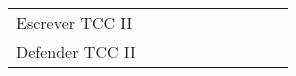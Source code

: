 \begin{table}[!htb]
{\begin{tabular}{p{4cm}|l|lllll|lll}
      \rowcolor[rgb]{0.914,0.914,0.914} Escrever TCC II                                                                                &                                      &                                      &                                      &                                      &                                      &                                      &                                      & {\cellcolor[rgb]{0.753,0.753,0.753}} & {\cellcolor[rgb]{0.753,0.753,0.753}} \\
      Defender TCC II                                                                                                                  &                                      &                                      &                                      &                                      &                                      &                                      &                                      &                                      & {\cellcolor[rgb]{0.753,0.753,0.753}} \\
      \toprule
    \end{tabular}
  }
\end{table}
